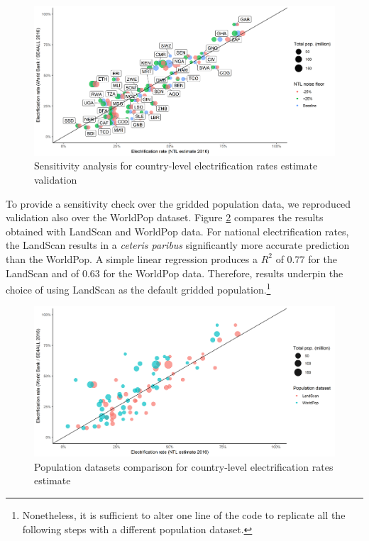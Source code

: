 \documentclass[preprint,12pt]{elsarticle}
\begin{document}
\begin{figure}[H]
    \centering
    \includegraphics[scale=0.5]{figures/sensitivity_noise.png}
    \caption{Sensitivity analysis for country-level electrification rates estimate validation}
    \label{ntlesmap2}
\end{figure}

To provide a sensitivity check over the gridded population data, we reproduced validation also over the WorldPop dataset.  Figure \ref{ntlesmap3} compares the results obtained with LandScan and WorldPop data. For national electrification rates, the LandScan results in a \textit{ceteris paribus} significantly more accurate prediction than the WorldPop. A simple linear regression produces a $R^2$ of 0.77 for the LandScan and of 0.63 for the WorldPop data. Therefore, results underpin the choice of using LandScan as the default gridded population.\footnote{Nonetheless, it is sufficient to alter one line of the code to replicate all the following steps with a different population dataset.}

\begin{figure}[H]
    \centering
    \includegraphics[scale=0.5]{figures/sensitivity_population.png}
    \caption{Population datasets comparison for country-level electrification rates estimate}
    \label{ntlesmap3}
\end{figure}
\end{document}
